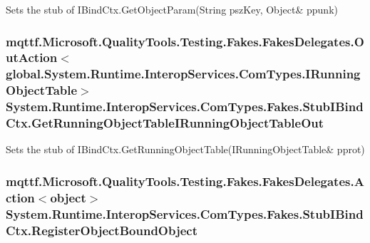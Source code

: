 Sets the stub of I\-Bind\-Ctx.\-Get\-Object\-Param(String psz\-Key, Object\& ppunk)

\hypertarget{class_system_1_1_runtime_1_1_interop_services_1_1_com_types_1_1_fakes_1_1_stub_i_bind_ctx_a1f492c84f3c693ace3275e0c69df2ebc}{
\subsubsection[{Get\-Running\-Object\-Table\-I\-Running\-Object\-Table\-Out}]{\setlength{\rightskip}{0pt plus 5cm}mqttf.\-Microsoft.\-Quality\-Tools.\-Testing.\-Fakes.\-Fakes\-Delegates.\-Out\-Action$<$global.\-System.\-Runtime.\-Interop\-Services.\-Com\-Types.\-I\-Running\-Object\-Table$>$ System.\-Runtime.\-Interop\-Services.\-Com\-Types.\-Fakes.\-Stub\-I\-Bind\-Ctx.\-Get\-Running\-Object\-Table\-I\-Running\-Object\-Table\-Out}}\label{class_system_1_1_runtime_1_1_interop_services_1_1_com_types_1_1_fakes_1_1_stub_i_bind_ctx_a1f492c84f3c693ace3275e0c69df2ebc}


Sets the stub of I\-Bind\-Ctx.\-Get\-Running\-Object\-Table(I\-Running\-Object\-Table\& pprot)

\hypertarget{class_system_1_1_runtime_1_1_interop_services_1_1_com_types_1_1_fakes_1_1_stub_i_bind_ctx_a34672663b8a87c8da6f1c6774e27af40}{
\subsubsection[{Register\-Object\-Bound\-Object}]{\setlength{\rightskip}{0pt plus 5cm}mqttf.\-Microsoft.\-Quality\-Tools.\-Testing.\-Fakes.\-Fakes\-Delegates.\-Action$<$object$>$ System.\-Runtime.\-Interop\-Services.\-Com\-Types.\-Fakes.\-Stub\-I\-Bind\-Ctx.\-Register\-Object\-Bound\-Object}}\label{class_system_1_1_runtime_1_1_interop_services_1_1_com_types_1_1_fakes_1_1_stub_i_bind_ctx_a34672663b8a87c8da6f1c6774e27af40}


